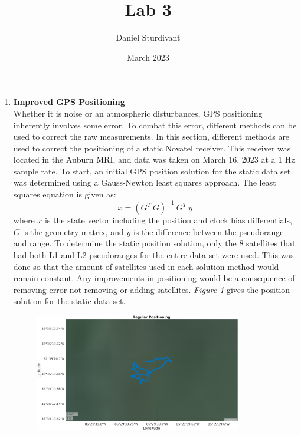 \documentclass[11pt]{article}
\author{Daniel Sturdivant}
\title{Lab 3}
\date{March 2023}
\begin{document}
\maketitle
\thispagestyle{fancy}
\setlength{\parindent}{0pt}

\begin{enumerate}[label=\textbf{\arabic*.}]
  \itemsep 24pt
  \item \textbf{Improved GPS Positioning} \\
    Whether it is noise or an atmospheric disturbances, GPS positioning 
    inherently involves some error. To combat this error, different methods
    can be used to correct the raw measurements. In this section, different 
    methods are used to correct the positioning of a static Novatel receiver. 
    This receiver was located in the Auburn MRI, and data was taken on March 
    16, 2023 at a 1 Hz sample rate. To start, an initial GPS position solution 
    for the static data set was determined using a Gauss-Newton least squares 
    approach. The least squares equation is given as:
    \begin{equation}
      x =(G^T\ G)^{-1}\ G^T\ y
    \end{equation}
    where $x$ is the state vector including the position and clock bias 
    differentials, $G$ is the geometry matrix, and $y$ is the difference 
    between the pseudorange and range. To determine the static position 
    solution, only the 8 satellites that had both L1 and L2 pseudoranges for 
    the entire data set were used. This was done so that the amount of 
    satellites used in each solution method would remain constant. Any 
    improvements in positioning would be a consequence of removing error not 
    removing or adding satellites. \emph{Figure 1} gives the position solution 
    for the static data set. 
    \begin{figure}[H]
        \centering
        \includegraphics[width=0.85\textwidth]{p1_a.png}

\end{figure}
\end{enumerate}
\end{document}
